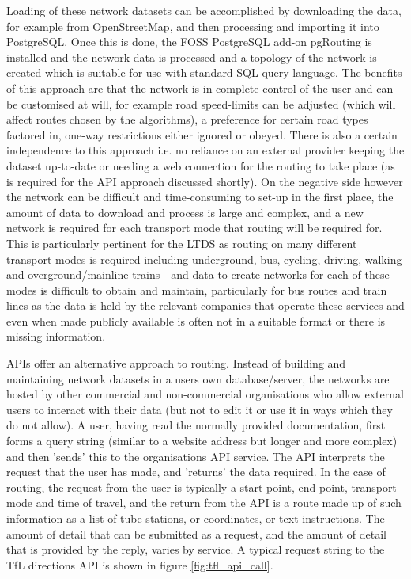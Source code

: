 Loading of these network datasets can be accomplished by downloading the data, for example from OpenStreetMap, and then processing and importing it into PostgreSQL. Once this is done, the FOSS PostgreSQL add-on pgRouting is installed and the network data is processed and a topology of the network is created which is suitable for use with standard SQL query language. The benefits of this approach are that the network is in complete control of the user and can be customised at will, for example road speed-limits can be adjusted (which will affect routes chosen by the algorithms), a preference for certain road types factored in, one-way restrictions either ignored or obeyed. There is also a certain independence to this approach i.e. no reliance on an external provider keeping the dataset up-to-date or needing a web connection for the routing to take place (as is required for the API approach discussed shortly). On the negative side however the network can be difficult and time-consuming to set-up in the first place, the amount of data to download and process is large and complex, and a new network is required for each transport mode that routing will be required for. This is particularly pertinent for the LTDS as routing on many different transport modes is required including underground, bus, cycling, driving, walking and overground/mainline trains - and data to create networks for each of these modes is difficult to obtain and maintain, particularly for bus routes and train lines as the data is held by the relevant companies that operate these services and even when made publicly available is often not in a suitable format or there is missing information.

APIs offer an alternative approach to routing. Instead of building and maintaining network datasets in a users own database/server, the networks are hosted by other commercial and non-commercial organisations who allow external users to interact with their data (but not to edit it or use it in ways which they do not allow).  A user, having read the normally provided documentation, first forms a query string (similar to a website address but longer and more complex) and then 'sends' this to the organisations API service. The API interprets the request that the user has made, and 'returns' the data required. In the case of routing, the request from the user is typically a start-point, end-point, transport mode and time of travel, and the return from the API is a route made up of such information as a list of tube stations, or coordinates, or text instructions. The amount of detail that can be submitted as a request, and the amount of detail that is provided by the reply, varies by service. A typical request string to the TfL directions API is shown in figure \ref{fig:tfl_api_call}.

